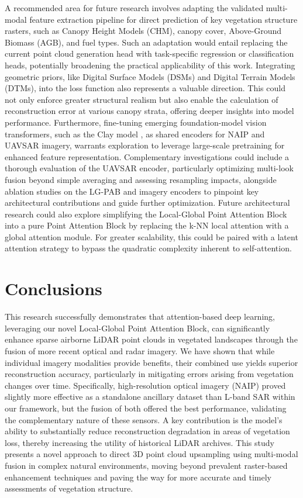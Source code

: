\documentclass[remotesensing,article,submit,pdftex,moreauthors]{Definitions/mdpi}
\begin{document}
A recommended area for future research involves adapting the validated multi-modal feature extraction pipeline for direct prediction of key vegetation structure rasters, such as Canopy Height Models (CHM), canopy cover, Above-Ground Biomass (AGB), and fuel types. Such an adaptation would entail replacing the current point cloud generation head with task-specific regression or classification heads, potentially broadening the practical applicability of this work. Integrating geometric priors, like Digital Surface Models (DSMs) and Digital Terrain Models (DTMs), into the loss function also represents a valuable direction. This could not only enforce greater structural realism but also enable the calculation of reconstruction error at various canopy strata, offering deeper insights into model performance. Furthermore, fine-tuning emerging foundation-model vision transformers, such as the Clay model \cite{clay_model_v1p5}, as shared encoders for NAIP and UAVSAR imagery, warrants exploration to leverage large-scale pretraining for enhanced feature representation. Complementary investigations could include a thorough evaluation of the UAVSAR encoder, particularly optimizing multi-look fusion beyond simple averaging and assessing resampling impacts, alongside ablation studies on the LG-PAB and imagery encoders to pinpoint key architectural contributions and guide further optimization. Future architectural research could also explore simplifying the Local-Global Point Attention Block into a pure Point Attention Block by replacing the k-NN local attention with a global attention module. For greater scalability, this could be paired with a latent attention strategy \cite{liu2024deepseek} to bypass the quadratic complexity inherent to self-attention.


\section{Conclusions}

This research successfully demonstrates that attention-based deep learning, leveraging our novel Local-Global Point Attention Block, can significantly enhance sparse airborne LiDAR point clouds in vegetated landscapes through the fusion of more recent optical and radar imagery. We have shown that while individual imagery modalities provide benefits, their combined use yields superior reconstruction accuracy, particularly in mitigating errors arising from vegetation changes over time. Specifically, high-resolution optical imagery (NAIP) proved slightly more effective as a standalone ancillary dataset than L-band SAR within our framework, but the fusion of both offered the best performance, validating the complementary nature of these sensors. A key contribution is the model's ability to substantially reduce reconstruction degradation in areas of vegetation loss, thereby increasing the utility of historical LiDAR archives. This study presents a novel approach to direct 3D point cloud upsampling using multi-modal fusion in complex natural environments, moving beyond prevalent raster-based enhancement techniques and paving the way for more accurate and timely assessments of vegetation structure.
\end{document}
